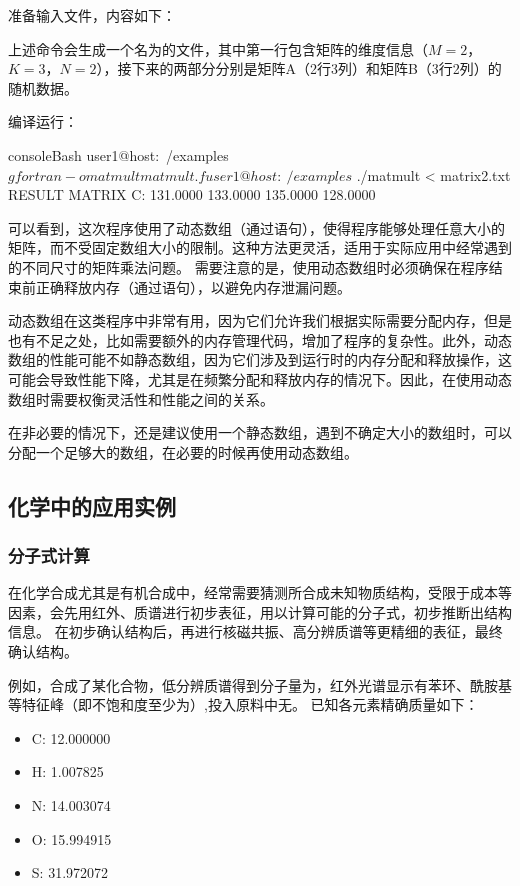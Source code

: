 准备输入文件，内容如下：
上述命令会生成一个名为的文件，其中第一行包含矩阵的维度信息（$M=2$，$K=3$，$N=2$），接下来的两部分分别是矩阵A（2行3列）和矩阵B（3行2列）的随机数据。

编译运行：
\begin{envcode}{console}{Bash}
user1@host:~/examples$ gfortran -o matmult matmult.f
user1@host:~/examples$ ./matmult < matrix2.txt
 RESULT MATRIX C:
        131.0000        133.0000
        135.0000        128.0000
\end{envcode}

可以看到，这次程序使用了动态数组（通过语句），使得程序能够处理任意大小的矩阵，而不受固定数组大小的限制。这种方法更灵活，适用于实际应用中经常遇到的不同尺寸的矩阵乘法问题。
需要注意的是，使用动态数组时必须确保在程序结束前正确释放内存（通过语句），以避免内存泄漏问题。

动态数组在这类程序中非常有用，因为它们允许我们根据实际需要分配内存，但是也有不足之处，比如需要额外的内存管理代码，增加了程序的复杂性。此外，动态数组的性能可能不如静态数组，因为它们涉及到运行时的内存分配和释放操作，这可能会导致性能下降，尤其是在频繁分配和释放内存的情况下。因此，在使用动态数组时需要权衡灵活性和性能之间的关系。

在非必要的情况下，还是建议使用一个静态数组，遇到不确定大小的数组时，可以分配一个足够大的数组，在必要的时候再使用动态数组。

\subsection{化学中的应用实例}

\subsubsection{分子式计算}
在化学合成尤其是有机合成中，经常需要猜测所合成未知物质结构，受限于成本等因素，会先用红外、质谱进行初步表征，用以计算可能的分子式，初步推断出结构信息。
在初步确认结构后，再进行核磁共振、高分辨质谱等更精细的表征，最终确认结构。

例如，合成了某化合物，低分辨质谱得到分子量为，红外光谱显示有苯环、酰胺基等特征峰（即不饱和度至少为）,投入原料中无。
已知各元素精确质量如下：
\begin{itemize}
      \item C: 12.000000
      \item H: 1.007825
      \item N: 14.003074
      \item O: 15.994915
      \item S: 31.972072
\end{itemize}

